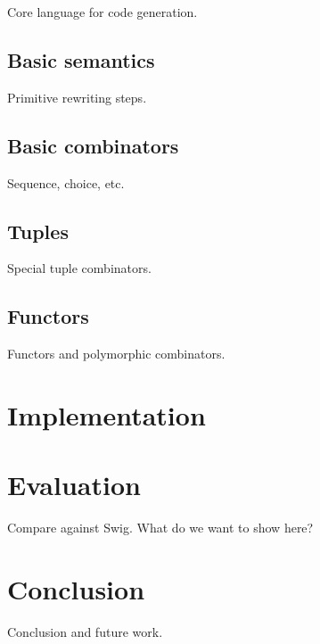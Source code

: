 \documentclass{article}
\begin{document}
Core language for code generation.

\subsection{Basic semantics}

Primitive rewriting steps.

\subsection{Basic combinators}

Sequence, choice, etc.

\subsection{Tuples}

Special tuple combinators.

\subsection{Functors}

Functors and polymorphic combinators.


\section{Implementation}



\section{Evaluation}

Compare against Swig. What do we want to show here?


\section{Conclusion}

Conclusion and future work.
\end{document}
